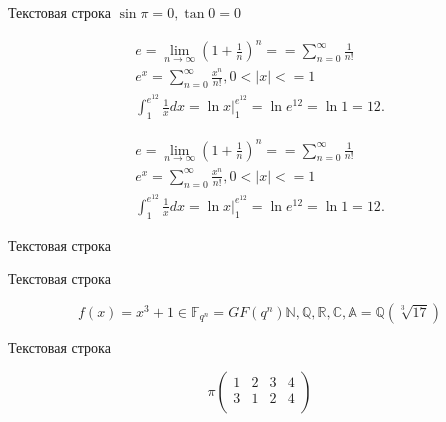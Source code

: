 \documentclass[a4paper,12pt, landscape]{report}
\renewcommand{\le}{<=}
\begin{document}
Текстовая строка $\sin\pi = 0, \tan 0 = 0  $

\begin{gather*}
e = \lim_{n\to \infty} \left(1 + \frac{1}{n}\right)^n =
= \sum_{n=0}^\infty \frac{1}{n!}\\
e^x = \sum_{n=0}^\infty \frac{x^n}{n!}, 0 < |x| \le 1
\\
\int_{1}^{e^{12}} \frac{1}{x}dx = \ln x \big|_{1}^{e^{12}} =
\ln e^{12} = \ln 1 = 12.
\end{gather*}

\begin{multline}
e = \lim_{n\to \infty} \left(1 + \frac{1}{n}\right)^n =
= \sum_{n=0}^\infty \frac{1}{n!}\\
e^x = \sum_{n=0}^\infty \frac{x^n}{n!}, 0 < |x| \le 1
\\
\int_{1}^{e^{12}} \frac{1}{x}dx = \ln x \big|_{1}^{e^{12}} =
\ln e^{12} = \ln 1 = 12.
\end{multline}


Текстовая строка

Текстовая строка

$$
f(x) = x^3+1 \in \mathbb F_{q^n} = GF(q^n)
\mathbb N, \mathbb Q, \mathbb R, \mathbb C, \mathbb A = \mathbb Q(\sqrt[3]{17})
$$


Текстовая строка


$$ \pi \left(
\begin{array}{cccc}
1 & 2 & 3 & 4\\
3 & 1 & 2 & 4\\
\end{array}
\right)
$$
\end{document}
